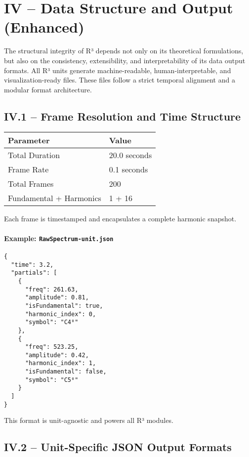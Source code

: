 \documentclass{article}
\begin{document}
\section*{IV – Data Structure and Output (Enhanced)}

The structural integrity of R³ depends not only on its theoretical formulations, but also on the consistency, extensibility, and interpretability of its data output formats. All R³ units generate machine-readable, human-interpretable, and visualization-ready files. These files follow a strict temporal alignment and a modular format architecture.

\subsection*{IV.1 – Frame Resolution and Time Structure}

\begin{center}
\begin{tabular}{|l|l|}
\hline
\textbf{Parameter} & \textbf{Value} \\
\hline
Total Duration & 20.0 seconds \\
Frame Rate & 0.1 seconds \\
Total Frames & 200 \\
Fundamental + Harmonics & 1 + 16 \\
\hline
\end{tabular}
\end{center}

Each frame is timestamped and encapsulates a complete harmonic snapshot.

\paragraph{Example: \texttt{RawSpectrum-unit.json}}

\begin{verbatim}
{
  "time": 3.2,
  "partials": [
    {
      "freq": 261.63,
      "amplitude": 0.81,
      "isFundamental": true,
      "harmonic_index": 0,
      "symbol": "C4⁰"
    },
    {
      "freq": 523.25,
      "amplitude": 0.42,
      "harmonic_index": 1,
      "isFundamental": false,
      "symbol": "C5⁰"
    }
  ]
}
\end{verbatim}

This format is unit-agnostic and powers all R³ modules.

\subsection*{IV.2 – Unit-Specific JSON Output Formats}
\end{document}

